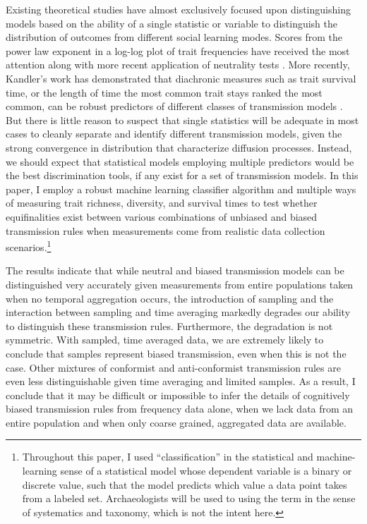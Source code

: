 Existing theoretical studies have almost exclusively focused upon distinguishing
models based on the ability of a single statistic or variable to
distinguish the distribution of outcomes from different social learning
modes. Scores from the power law exponent
in a log-log plot of trait frequencies have received the most attention along with more recent application of neutrality tests \cite{Bentley2003, bentley2004random, Mesoudi2009, slatkin1994exact, slatkin1996correction}.   
More recently, Kandler's work has demonstrated that diachronic measures such
as trait survival time, or the length of time the most common trait
stays ranked the most common, can be robust predictors of different
classes of transmission models
\cite{kandler2013non, wilderkandler2015}. 
But there is little reason to suspect that single statistics will be adequate in most cases to cleanly separate and identify different transmission models, given the strong convergence in distribution that characterize diffusion processes.  Instead, we should expect that statistical models employing multiple predictors would be the best discrimination tools, if any exist for a set of transmission models.  In this paper, I employ
a robust machine learning classifier algorithm and multiple ways of measuring
trait richness, diversity, and survival times to test whether
equifinalities exist between various combinations of unbiased and biased
transmission rules when measurements come from realistic data collection
scenarios.\footnote{Throughout this paper, I used ``classification'' in the statistical and machine-learning sense of a statistical model whose dependent variable is a binary or discrete value, such that the model predicts which value a data point takes from a labeled set.  Archaeologists will be used to using the term in the sense of systematics and taxonomy, which is not the intent here.}

The results indicate that while neutral and biased transmission models
can be distinguished very accurately given measurements from entire
populations taken when no temporal aggregation occurs, the introduction of
sampling and the interaction between sampling and time averaging
 markedly degrades our ability to distinguish these transmission
rules. Furthermore, the degradation is not symmetric. With sampled, time
averaged data, we are extremely likely to conclude that samples
represent biased transmission, even when this is not the case. Other
mixtures of conformist and anti-conformist transmission rules are even
less distinguishable given time averaging and limited samples.  As a result, I conclude that it may be difficult or impossible to infer the details of cognitively biased transmission rules from frequency data alone, when we lack data from an entire population and when only coarse grained, aggregated data are available.

